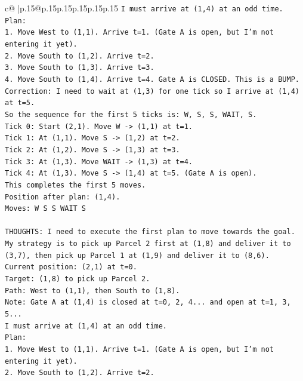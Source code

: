 \documentclass{article}
\begin{document}
{\begin{supertabular}{c@{$\;$}|p{.15\linewidth}@{}p{.15\linewidth}p{.15\linewidth}p{.15\linewidth}p{.15\linewidth}p{.15\linewidth}}
{{{\texttt{I must arrive at (1,4) at an odd time.} \\
\texttt{Plan:} \\
\texttt{1. Move West to (1,1). Arrive t=1. (Gate A is open, but I'm not entering it yet).} \\
\texttt{2. Move South to (1,2). Arrive t=2.} \\
\texttt{3. Move South to (1,3). Arrive t=3.} \\
\texttt{4. Move South to (1,4). Arrive t=4. Gate A is CLOSED. This is a BUMP.} \\
\texttt{Correction: I need to wait at (1,3) for one tick so I arrive at (1,4) at t=5.} \\
\texttt{So the sequence for the first 5 ticks is: W, S, S, WAIT, S.} \\
\texttt{Tick 0: Start (2,1). Move W {-}> (1,1) at t=1.} \\
\texttt{Tick 1: At (1,1). Move S {-}> (1,2) at t=2.} \\
\texttt{Tick 2: At (1,2). Move S {-}> (1,3) at t=3.} \\
\texttt{Tick 3: At (1,3). Move WAIT {-}> (1,3) at t=4.} \\
\texttt{Tick 4: At (1,3). Move S {-}> (1,4) at t=5. (Gate A is open).} \\
\texttt{This completes the first 5 moves.} \\
\texttt{Position after plan: (1,4).} \\
\texttt{Moves: W S S WAIT S} \\
\\ 
\texttt{THOUGHTS: I need to execute the first plan to move towards the goal. My strategy is to pick up Parcel 2 first at (1,8) and deliver it to (3,7), then pick up Parcel 1 at (1,9) and deliver it to (8,6).} \\
\texttt{Current position: (2,1) at t=0.} \\
\texttt{Target: (1,8) to pick up Parcel 2.} \\
\texttt{Path: West to (1,1), then South to (1,8).} \\
\texttt{Note: Gate A at (1,4) is closed at t=0, 2, 4... and open at t=1, 3, 5...} \\
\texttt{I must arrive at (1,4) at an odd time.} \\
\texttt{Plan:} \\
\texttt{1. Move West to (1,1). Arrive t=1. (Gate A is open, but I'm not entering it yet).} \\
\texttt{2. Move South to (1,2). Arrive t=2.} \\
}}}
\end{supertabular}}
\end{document}
